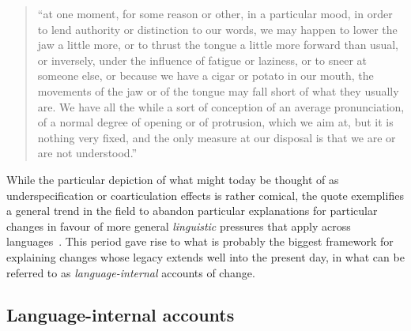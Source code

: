 \begin{quote}
``at one moment, for some reason or other, in a particular mood, in order to lend authority or distinction to our words, we may happen to lower the jaw a little more, or to thrust the tongue a little more forward than usual, or inversely, under the influence of fatigue or laziness, or to sneer at someone else, or because we have a cigar or potato in our mouth, the movements of the jaw or of the tongue may fall short of what they usually are. We have all the while a sort of conception of an average pronunciation, of a normal degree of opening or of protrusion, which we aim at, but it is nothing very fixed, and the only measure at our disposal is that we are or are not understood.''~\citep[p.166]{Jespersen1922}
\end{quote}

While the particular depiction of what might today be thought of as underspecification or coarticulation effects is rather comical, the quote exemplifies a general trend in the field to abandon particular explanations for particular changes in favour of more general \emph{linguistic} pressures that apply across languages~\citep[see also][ch.21]{Bloomfield1933}. This period gave rise to what is probably the biggest framework for explaining changes whose legacy extends well into the present day, in what can be referred to as \emph{language-internal} accounts of change.

\subsection{Language-internal accounts}

